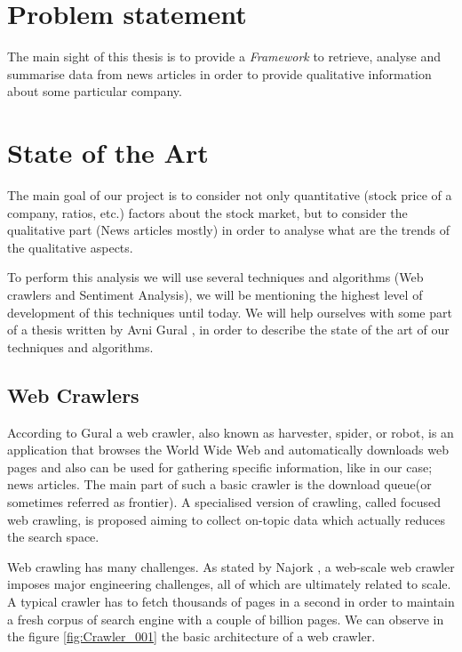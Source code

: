 	\section{Problem statement}
	
	The main sight of this thesis is to  provide a \emph{Framework} to retrieve, analyse and summarise data from news articles in order to provide qualitative information about some particular company.

	\clearpage
	\section{State of the Art}
	
	The main goal of our project is to consider not only quantitative (stock price of a company, ratios, etc.) factors about the stock market, but to consider the qualitative part (News articles mostly) in order to analyse what are the trends of the qualitative aspects.

	To perform this analysis we will use several techniques and algorithms (Web crawlers and Sentiment Analysis), we will be mentioning the highest level of development of this techniques until today. We will help ourselves with some part of a thesis written by Avni Gural \cite{V2013}, in order to describe the state of the art of our techniques and algorithms.
	
	\subsection{Web Crawlers}
	
	According to Gural \cite{V2013} a web crawler, also known as harvester, spider, or robot, is an application that browses the World Wide Web and automatically downloads web pages and also can be used for gathering specific information, like in our case; news articles. The main part of such a basic crawler is the download queue(or sometimes referred as frontier). A specialised version of crawling, called focused web crawling, is proposed aiming to collect on-topic data which actually reduces the search space.
			
	Web crawling has many challenges. As stated by Najork \cite{N2009}, a web-scale web crawler imposes major engineering challenges, all of which are ultimately related to scale. A typical crawler has to fetch thousands of pages in a second in order to maintain a fresh corpus of search engine with a couple of billion pages. We can observe in the figure \ref{fig:Crawler_001} the basic architecture of a web crawler.
	
